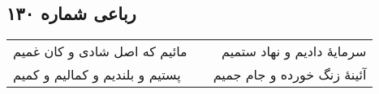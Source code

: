 \begin{center}
\section*{رباعی شماره ۱۳۰}
\label{sec:sh130}
\begin{longtable}{l p{0.5cm} r}
مائیم که اصل شادی و کان غمیم
&&
سرمایهٔ دادیم و نهاد ستمیم
\\
پستیم و بلندیم و کمالیم و کمیم
&&
آئینهٔ زنگ خورده و جام جمیم
\\
\end{longtable}
\end{center}
